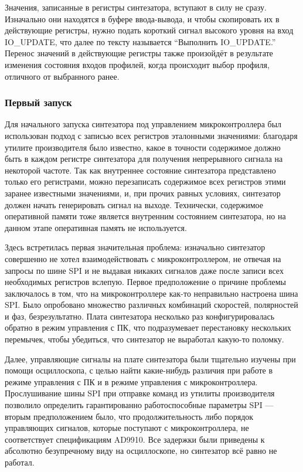 \documentclass[rusmathsym, eqnumwithinsec, amspack, hyperref]{bomgost}
\begin{document}
Значения, записанные в регистры синтезатора, вступают в силу не сразу. Изначально они находятся в буфере ввода-вывода, и чтобы скопировать их в действующие регистры, нужно подать короткий сигнал высокого уровня на вход IO\_UPDATE, что далее по тексту называется ``Выполнить IO\_UPDATE.'' Перенос значений в действующие регистры также произойдёт в результате изменения состояния входов профилей, когда происходит выбор профиля, отличного от выбранного ранее.

\subsubsection{Первый запуск}

Для начального запуска синтезатора под управлением микроконтроллера был использован подход с записью всех регистров эталонными значениями: благодаря утилите производителя было известно, какое в точности содержимое должно быть в каждом регистре синтезатора для получения непрерывного сигнала на некоторой частоте. Так как внутреннее состояние синтезатора представлено только его регистрами, можно перезаписать содержимое всех регистров этими заранее известными значениями, и, при прочих равных условиях, синтезатор должен начать генерировать сигнал на выходе. Технически, содержимое оперативной памяти тоже является внутренним состоянием синтезатора, но на данном этапе оперативная память не используется.

Здесь встретилась первая значительная проблема: изначально синтезатор совершенно не хотел взаимодействовать с микроконтроллером, не отвечая на запросы по шине SPI и не выдавая никаких сигналов даже после записи всех необходимых регистров вслепую. Первое предположение о причине проблемы заключалось в том, что на микроконтроллере как-то неправильно настроена шина SPI. Было опробовано множество различных комбинаций скоростей, полярностей и фаз, безрезультатно. Плата синтезатора несколько раз конфигурировалась обратно в режим управления с ПК, что подразумевает перестановку нескольких перемычек, чтобы убедиться, что синтезатор не выработал какую-то поломку.

Далее, управляющие сигналы на плате синтезатора были тщательно изучены при помощи осциллоскопа, с целью найти какие-нибудь различия при работе в режиме управления с ПК и в режиме управления с микроконтроллера. Прослушивание шины SPI при отправке команд из утилиты производителя позволило определить гарантированно работоспособные параметры SPI --- вторым предположением было, что продолжительность либо порядок управляющих сигналов, которые поступают с микроконтроллера, не соответствует спецификациям AD9910. Все задержки были приведены к абсолютно безупречному виду на осциллоскопе, но синтезатор всё равно не работал.
\end{document}
